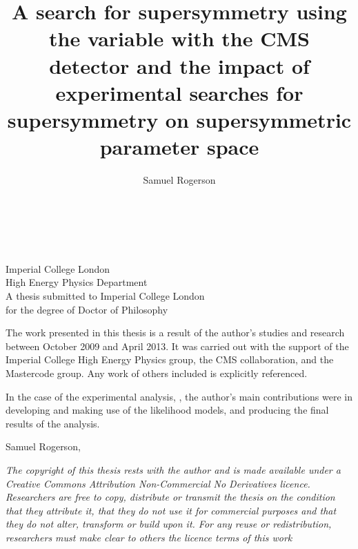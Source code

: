 \documentclass[]{mythesis}
\title{A search for supersymmetry using the \aT variable with the CMS detector
    and the impact of experimental searches for supersymmetry on supersymmetric
parameter space}
\author{Samuel Rogerson}
\begin{document}
    \thispagestyle{empty}%
    \begin{center}%
      \vspace*{2cm}%
      \begin{doublespace}%
        {\Huge\textbf{\thetitle}}\\%
      \end{doublespace}%
      \vspace*{3cm}%
      {\Large{{\theauthor} \\ {Imperial College London \\
        High Energy Physics Department}}}\\%
      \vspace*{6cm}%
      {A thesis submitted to Imperial College London \\ for the degree of
      Doctor of Philosophy}
    \end{center}%
    \clearpage

    \begin{declaration}
        The work presented in this thesis is a result of the author's studies
        and research between October 2009 and April 2013.  It was carried out
        with the support of the Imperial College High Energy Physics group, the
        CMS collaboration, and  the Mastercode group.  Any work of others
        included is explicitly referenced.

        In the case of the experimental analysis,
        , the author's main contributions were in
        developing and making use of the likelihood models, and producing the
        final results of the analysis.

        \vspace*{1cm}
        \begin{flushright}
            Samuel Rogerson, \thedate
        \end{flushright}
        \vfill
        \emph{The copyright of this thesis rests with the author and is made
            available under a Creative Commons Attribution Non-Commercial No
            Derivatives licence. Researchers are free to copy, distribute or
            transmit the thesis on the condition that they attribute it, that
            they do not use it for commercial purposes and that they do not
            alter, transform or build upon it. For any reuse or redistribution,
        researchers must make clear to others the licence terms of this work}

    \end{declaration}
    
\end{document}
